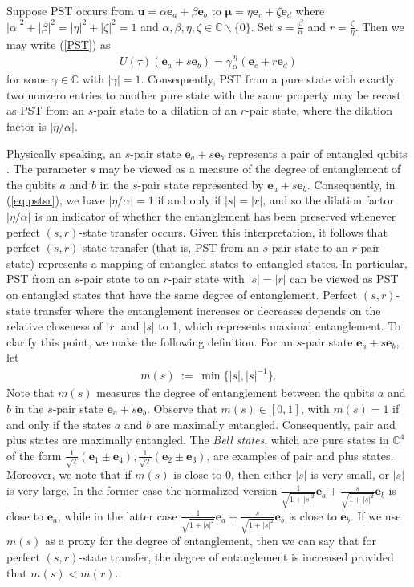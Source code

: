 \documentclass{article}
\numberwithin{equation}{section}
\newcommand{\be}{\mathbf e}
\newcommand{\bu}{\mathbf u}
\newcommand{\bmu}{{\boldsymbol{\mu}}}
\def\C{\mathbb{C}}
\begin{document}
{Suppose PST occurs from $\bu=\alpha\be_a+\beta\be_b$ to $\bmu=\eta\be_c+\zeta\be_d$ where $|\alpha|^2+|\beta|^2=|\eta|^2+|\zeta|^2=1$ and $\alpha,\beta,\eta,\zeta\in\C\backslash\{0\}$. Set $s=\frac{\beta}{\alpha}$ and $r=\frac{\zeta}{\eta}$. Then we may write (\ref{PST}) as
\begin{eqnarray}
\label{eq:pstsr}
U(\tau)(\be_a+s\be_b)=\gamma\frac{\eta}{\alpha}(\be_c+r\be_d)
\end{eqnarray}
for some $\gamma\in\C$ with $|\gamma|=1$. Consequently, PST from a pure state with exactly two nonzero entries to another pure state with the same property may be recast as PST from an $s$-pair state to a dilation of an $r$-pair state, where the dilation factor is $|\eta/\alpha|$. 

Physically speaking, an $s$-pair state $\be_a+s\be_b$ represents a pair of entangled qubits \cite{kim2024generalization}. The parameter $s$ may be viewed as a measure of the degree of entanglement of the qubits $a$ and $b$ in the $s$-pair state represented by $\be_a+s\be_b$. Consequently, in (\ref{eq:pstsr}), we have $|\eta/\alpha|=1$ if and only if $|s|=|r|$, and so the dilation factor $|\eta/\alpha|$ is an indicator of whether the entanglement has been preserved whenever perfect $(s,r)$-state transfer occurs. Given this interpretation, it follows that perfect $(s,r)$-state transfer (that is,
PST from an $s$-pair state to an $r$-pair state) represents a mapping of entangled states to entangled states. In particular, PST from an $s$-pair state to an $r$-pair state with $|s|=|r|$ can be viewed as PST on entangled states that have the same degree of entanglement. Perfect $(s,r)$-state transfer where the entanglement increases or decreases depends on the relative closeness of $|r|$ and $|s|$ to 1, which represents maximal entanglement. To clarify this point, we make the following definition. 
For an $s$-pair state $\be_a+s\be_b$, let 
\begin{eqnarray*}
m(s)\ :=\ \min\big\{|s|, |s|^{-1}\big\}.
\end{eqnarray*}
Note that $m(s)$ measures the degree of entanglement between the qubits $a$ and $b$ in the $s$-pair state $\be_a+s\be_b$. Observe that $m(s) \in [0,1]$, with $m(s)=1$ if and only if  the states $a$ and $b$ are maximally entangled. Consequently, pair and plus states are maximally entangled. The \textit{Bell states}, which are pure states in $\C^4$ of the form $\frac{1}{\sqrt{2}}(\be_1\pm \be_4),\frac{1}{\sqrt{2}}(\be_2\pm \be_3)$, are examples of pair and plus states. Moreover, we note that if $m(s)$ is close to $0$, then either $|s|$ is very small, or $|s|$ is very large. In the former case the normalized version $\frac1{\sqrt{1+|s|^2}} \be_a + \frac{s}{\sqrt{1+|s|^2}}\be_b$ is close to $\be_a$, while in the latter case $\frac1{\sqrt{1+|s|^2}} \be_a + \frac{s}{\sqrt{1+|s|^2}}\be_b$ is close to $\be_b$.
If we use $m(s)$ as a proxy for the degree of entanglement, then we can say that for perfect $(s,r)$-state transfer, the degree of entanglement is increased provided that $m(s) < m(r)$. 

}
\end{document}

